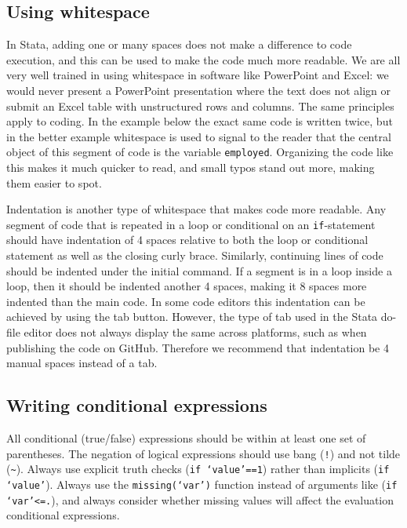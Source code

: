
\subsection{Using whitespace}

In Stata, adding one or many spaces does not make a difference to code execution,
and this can be used to make the code much more readable.
We are all very well trained in using whitespace in software like PowerPoint and Excel:
we would never present a PowerPoint presentation where the text does not align
or submit an Excel table with unstructured rows and columns.
The same principles apply to coding.
In the example below the exact same code is written twice,
but in the better example whitespace is used to signal to the reader
that the central object of this segment of code is the variable \texttt{employed}.
Organizing the code like this makes it much quicker to read,
and small typos stand out more, making them easier to spot.


\noindent Indentation is another type of whitespace that makes code more readable.
Any segment of code that is repeated in a loop or conditional on an
\texttt{if}-statement should have indentation of 4 spaces relative
to both the loop or conditional statement as well as the closing curly brace.
Similarly, continuing lines of code should be indented under the initial command.
If a segment is in a loop inside a loop, then it should be indented another 4 spaces,
making it 8 spaces more indented than the main code.
In some code editors this indentation can be achieved by using the tab button.
However, the type of tab used in the Stata do-file editor does not always display the same across platforms,
such as when publishing the code on GitHub.
Therefore we recommend that indentation be 4 manual spaces instead of a tab.


\subsection{Writing conditional expressions}

All conditional (true/false) expressions should be within at least one set of parentheses.
The negation of logical expressions should use bang (\texttt{!}) and not tilde (\texttt{\~}).
Always use explicit truth checks (\texttt{if `value'==1}) rather than implicits (\texttt{if `value'}).
Always use the \texttt{missing(`var')} function instead of arguments like (\texttt{if `var'<=.}),
and always consider whether missing values will affect the evaluation conditional expressions.

